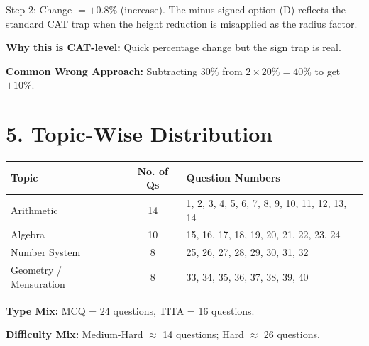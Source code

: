 \documentclass[11pt]{article}
\begin{document}
Step 2: Change \(=+0.8\%\) (increase). The minus-signed option (D) reflects the standard CAT trap when the height reduction is misapplied as the radius factor.

\textbf{Why this is CAT-level:} Quick percentage change but the sign trap is real.

\textbf{Common Wrong Approach:} Subtracting \(30\%\) from \(2\times 20\% = 40\%\) to get \(+10\%\).

\newpage
\section*{5. Topic-Wise Distribution}

\begin{longtable}{|l|c|p{8cm}|}
\hline
\textbf{Topic} & \textbf{No. of Qs} & \textbf{Question Numbers} \\ \hline
Arithmetic         & 14 & 1, 2, 3, 4, 5, 6, 7, 8, 9, 10, 11, 12, 13, 14 \\ \hline
Algebra            & 10 & 15, 16, 17, 18, 19, 20, 21, 22, 23, 24 \\ \hline
Number System      &  8 & 25, 26, 27, 28, 29, 30, 31, 32 \\ \hline
Geometry / Mensuration & 8 & 33, 34, 35, 36, 37, 38, 39, 40 \\ \hline
\end{longtable}

\textbf{Type Mix:} MCQ = 24 questions, TITA = 16 questions.

\textbf{Difficulty Mix:} Medium-Hard \(\approx\) 14 questions; Hard \(\approx\) 26 questions.
\end{document}
